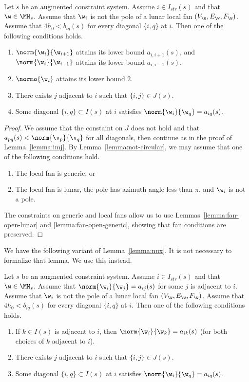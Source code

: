\begin{lemma}
Let $s$ be an augmented constraint system.  Assume $i\in I_{str}(s)$ and
that $\w\in \MM_s$.  
Assume  that $\w_i$ is not the pole of a lunar local fan $(V_\w,E_\w,F_\w)$.
Assume that $4h_0 < b_{iq}(s)$ for every diagonal $\{i,q\}$ at $i$.
Then one of the following conditions holds.
\begin{enumerate}
\item $\norm{\w_i}{\w_{i+1}}$ attains its lower bound $a_{i,i+1}(s)$, and
 $\norm{\w_i}{\w_{i-1}}$ attains its lower bound $a_{i,i-1}(s)$.
\item $\normo{\w_i}$ attains its lower bound $2$.
\item There exists $j$ adjacent to $i$ such that $\{i,j\}\in J(s)$.
\item Some diagonal $\{i,q\}\subset I(s)$ at $i$ satisfies
$\norm{\w_i}{\w_q}=a_{i q}(s)$.
\end{enumerate}
\end{lemma}

\begin{proof} We assume that the constaint on $J$ does not hold and
that $a_{p q}(s)<\norm{\v_p}{\v_q}$ for all diagonals, then continue as in the proof of
Lemma~\ref{lemma:imj}.
By Lemma~\ref{lemma:not-circular}, we may assume that one of the
following
conditions hold.
\begin{enumerate}
\item The local fan is generic, or
\item The local fan is lunar, the pole has azimuth
angle less than $\pi$, and $\w_i$ is not a pole.  
\end{enumerate}
The constraints on generic and local fans
allow us to use Lemmas~\ref{lemma:fan-open-lunar} and
\ref{lemma:fan-open-generic}, showing that fan conditions are preserved.
\end{proof}

We have the following variant of Lemma~\ref{lemma:nux}.
It is not necessary to formalize that lemma.  We use this instead.

\begin{lemma}
Let $s$ be an augmented constraint system.  Assume $i\in I_{str}(s)$
and that $\w\in \MM_s$.   
Assume that $\norm{\w_i}{\w_j}=a_{ij}(s)$ for
some $j$ is adjacent to $i$.  
Assume  that $\w_i$ is not the pole of a lunar local fan $(V_\w,E_\w,F_\w)$.
Assume that $4h_0 < b_{iq}(s)$ for every diagonal $\{i,q\}$ at $i$.
Then
one of the following conditions holds.
\begin{enumerate}
\item If $k\in I(s)$ is adjacent to $i$, then $\norm{\w_i}{\w_k}=a_{ik}(s)$
(for both choices of $k$ adjacent to $i$).
\item There exists $j$ adjacent to $i$ such that $\{i,j\}\in J(s)$.
\item Some diagonal $\{i,q\}\subset I(s)$ at $i$ satisfies
$\norm{\w_i}{\w_q}=a_{i q}(s)$.
\end{enumerate}
\end{lemma}


